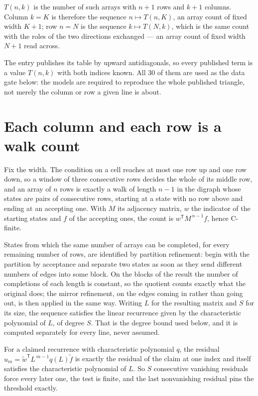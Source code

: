 \documentclass[11pt]{article}
\theoremstyle{definition}
\begin{document}
$T(n,k)$ is the number of such arrays with $n + 1$ rows and $k + 1$ columns. Column $k = K$ is therefore the sequence $n \mapsto T(n,K)$, an array count of fixed width $K + 1$; row $n = N$ is the sequence $k \mapsto T(N,k)$, which is the same count with the roles of the two directions exchanged --- an array count of fixed width $N + 1$ read across.

The entry publishes its table by upward antidiagonals, so every published term is a value $T(n,k)$ with both indices known. All 30 of them are used as the data gate below: the models are required to reproduce the whole published triangle, not merely the column or row a given line is about.

\section{Each column and each row is a walk count}

Fix the width. The condition on a cell reaches at most one row up and one row down, so a window of three consecutive rows decides the whole of its middle row, and an array of $n$ rows is exactly a walk of length $n-1$ in the digraph whose states are pairs of consecutive rows, starting at a state with no row above and ending at an accepting one. With $M$ its adjacency matrix, $w$ the indicator of the starting states and $f$ of the accepting ones, the count is $w^{\mathsf T}M^{\,n-1}f$, hence C-finite.

States from which the same number of arrays can be completed, for every remaining number of rows, are identified by partition refinement: begin with the partition by acceptance and separate two states as soon as they send different numbers of edges into some block. On the blocks of the result the number of completions of each length is constant, so the quotient counts exactly what the original does; the mirror refinement, on the edges coming in rather than going out, is then applied in the same way. Writing $L$ for the resulting matrix and $S$ for its size, the sequence satisfies the linear recurrence given by the characteristic polynomial of $L$, of degree $S$. That is the degree bound used below, and it is computed separately for every line, never assumed.

For a claimed recurrence with characteristic polynomial $q$, the residual $u_m = \tilde w^{\mathsf T}L^{\,m-1}q(L)\tilde f$ is exactly the residual of the claim at one index and itself satisfies the characteristic polynomial of $L$. So $S$ consecutive vanishing residuals force every later one, the test is finite, and the last nonvanishing residual pins the threshold exactly.
\end{document}
